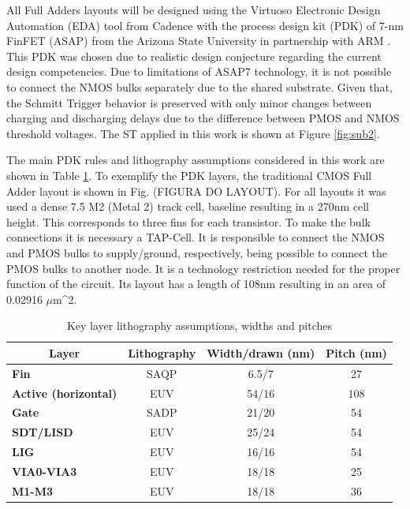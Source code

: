 \documentclass[ecp,tc, english]{iiufrgs}
\begin{document}
All Full Adders layouts will be designed using the Virtuoso Electronic Design Automation (EDA) tool from Cadence\textregistered{} with the process design kit (PDK) of 7-nm FinFET (ASAP) from the Arizona State University in partnership with ARM \cite{clark2016asap7}. This PDK was chosen due to realistic design conjecture regarding the current design competencies. Due to limitations of ASAP7 technology, it is not possible to connect the NMOS bulks separately due to the shared substrate. Given that, the Schmitt Trigger behavior is preserved with only minor changes between charging and discharging delays due to the difference between PMOS and NMOS threshold voltages. The ST applied in this work is shown at Figure \ref{fig:sub2}.

The main PDK rules and lithography assumptions considered in this work are shown in Table \ref{layers}. To exemplify the PDK layers, the traditional CMOS Full Adder layout is shown in Fig. (FIGURA DO LAYOUT). For all layouts it was used a dense 7.5 M2 (Metal 2) track cell, baseline resulting in a 270nm cell height. This corresponds to three fins for each transistor. To make the bulk connections it is necessary a TAP-Cell. It is responsible to connect the NMOS and PMOS bulks to supply/ground, respectively, being possible to connect the PMOS bulks to another node. It is a technology restriction needed for the proper function of the circuit. Its layout has a length of 108nm resulting in an area of 0.02916 \(\mu\)m^{2}.

\begin{table}[]
\centering
\caption{Key layer lithography assumptions, widths and pitches}
\label{layers}
\begin{tabular}{|l|c|c|c|}
\hline
\multicolumn{1}{|c|}{\textbf{Layer}} & \textbf{Lithography} & \textbf{Width/drawn (nm)} & \textbf{Pitch (nm)} \\ \hline
\textbf{Fin}                         & SAQP                 & 6.5/7                     & 27                  \\ \hline
\textbf{Active (horizontal)}         & EUV                  & 54/16                     & 108                 \\ \hline
\textbf{Gate}                        & SADP                 & 21/20                     & 54                  \\ \hline
\textbf{SDT/LISD}                    & EUV                  & 25/24                     & 54                  \\ \hline
\textbf{LIG}                         & EUV                  & 16/16                     & 54                  \\ \hline
\textbf{VIA0-VIA3}                   & EUV                  & 18/18                     & 25                  \\ \hline
\textbf{M1-M3}                       & EUV                  & 18/18                     & 36                  \\ \hline
\end{tabular}
\end{table}
\end{document}
